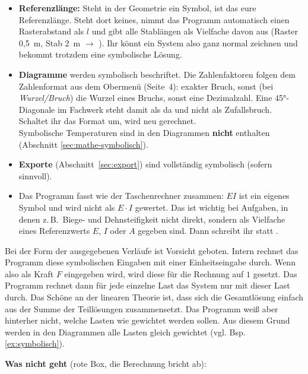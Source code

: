 \begin{itemize}
  \item \textbf{Referenzlänge:} Steht in der Geometrie ein Symbol, ist das eure Referenzlänge.
        Steht dort keines, nimmt das Programm automatisch einen Rasterabstand als $l$ und gibt
        alle Stablängen als Vielfache davon aus (Raster 0,5~m, Stab 2~m $\rightarrow$ ).
        Ihr könnt ein System also ganz normal zeichnen und bekommt trotzdem eine symbolische
        Lösung.
  \item \textbf{Diagramme} werden symbolisch beschriftet. Die Zahlenfaktoren folgen dem
        Zahlenformat aus dem Obermenü (Seite~4): exakter Bruch, sonst (bei \emph{Wurzel/Bruch})
        die Wurzel eines Bruchs, sonst eine Dezimalzahl. Eine 45°-Diagonale im Fachwerk steht
        damit als  da und nicht als Zufallsbruch. Schaltet ihr das Format um,
        wird neu gerechnet.\\
        Symbolische Temperaturen sind in den Diagrammen \textbf{nicht} enthalten (Abschnitt \ref{sec:mathe-symbolisch}).
  \item \textbf{Exporte} (Abschnitt~\ref{sec:export}) sind vollständig symbolisch (sofern sinnvoll).
  \item Das Programm fasst wie der Taschenrechner zusammen: $EI$ ist ein eigenes Symbol und wird
        nicht als $E\cdot I$ gewertet. Das ist wichtig bei Aufgaben, in denen z.\,B.\ Biege- und
        Dehnsteifigkeit nicht direkt, sondern als Vielfache eines Referenzwerts $E$, $I$ oder $A$
        gegeben sind. Dann schreibt ihr  statt .
\end{itemize}

Bei der Form der ausgegebenen Verläufe ist Vorsicht geboten. Intern rechnet das Programm diese symbolischen Eingaben
mit einer Einheitseingabe durch. Wenn also als Kraft $F$ eingegeben wird, wird diese für die Rechnung auf $1$ gesetzt.
Das Programm rechnet dann für jede einzelne Last das System nur mit dieser Last durch. Das Schöne an der linearen Theorie ist,
dass sich die Gesamtlösung einfach aus der Summe der Teillösungen zusammensetzt. Das Programm weiß aber hinterher nicht, welche
Lasten wie gewichtet werden sollen. Aus diesem Grund werden in den Diagrammen alle Lasten gleich gewichtet (vgl. Bsp. \ref{ex:symbolisch}).

\textbf{Was nicht geht} (rote Box, die Berechnung bricht ab):

